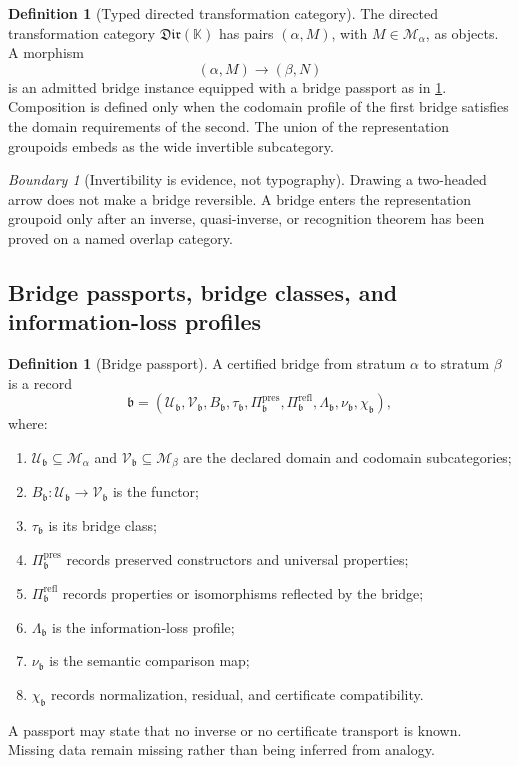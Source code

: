 \documentclass[11pt]{article}
\theoremstyle{definition}
\newtheorem{definition}[theorem]{Definition}
\theoremstyle{remark}
\newtheorem{boundary}[theorem]{Boundary}
\newcommand{\bbK}{\mathbb K}
\begin{document}
\begin{definition}[Typed directed transformation category]
\label{def:directed-transformation-category}
The directed transformation category \(\mathfrak{Dir}(\bbK)\) has pairs \((\alpha,M)\), with \(M\in\mathcal M_\alpha\), as objects.  A morphism
\[
(\alpha,M)\longrightarrow(\beta,N)
\]
is an admitted bridge instance equipped with a bridge passport as in \cref{def:bridge-passport}.  Composition is defined only when the codomain profile of the first bridge satisfies the domain requirements of the second.  The union of the representation groupoids embeds as the wide invertible subcategory.
\end{definition}

\begin{boundary}[Invertibility is evidence, not typography]
\label{bnd:invertibility-evidence}
Drawing a two-headed arrow does not make a bridge reversible.  A bridge enters the representation groupoid only after an inverse, quasi-inverse, or recognition theorem has been proved on a named overlap category.
\end{boundary}

\subsection{Bridge passports, bridge classes, and information-loss profiles}
\label{subsec:bridge-passports}

\begin{definition}[Bridge passport]
\label{def:bridge-passport}
A certified bridge from stratum \(\alpha\) to stratum \(\beta\) is a record
\[
\mathfrak b
=
(\mathcal U_\mathfrak b,\mathcal V_\mathfrak b,
 B_\mathfrak b,\tau_\mathfrak b,
 \Pi^{\mathrm{pres}}_\mathfrak b,
 \Pi^{\mathrm{refl}}_\mathfrak b,
 \Lambda_\mathfrak b,
 \nu_\mathfrak b,\chi_\mathfrak b),
\]
where:
\begin{enumerate}[label=\textup{(\roman*)}]
\item \(\mathcal U_\mathfrak b\subseteq\mathcal M_\alpha\) and \(\mathcal V_\mathfrak b\subseteq\mathcal M_\beta\) are the declared domain and codomain subcategories;
\item \(B_\mathfrak b:\mathcal U_\mathfrak b\to\mathcal V_\mathfrak b\) is the functor;
\item \(\tau_\mathfrak b\) is its bridge class;
\item \(\Pi^{\mathrm{pres}}_\mathfrak b\) records preserved constructors and universal properties;
\item \(\Pi^{\mathrm{refl}}_\mathfrak b\) records properties or isomorphisms reflected by the bridge;
\item \(\Lambda_\mathfrak b\) is the information-loss profile;
\item \(\nu_\mathfrak b\) is the semantic comparison map;
\item \(\chi_\mathfrak b\) records normalization, residual, and certificate compatibility.
\end{enumerate}
A passport may state that no inverse or no certificate transport is known.  Missing data remain missing rather than being inferred from analogy.
\end{definition}
\end{document}

